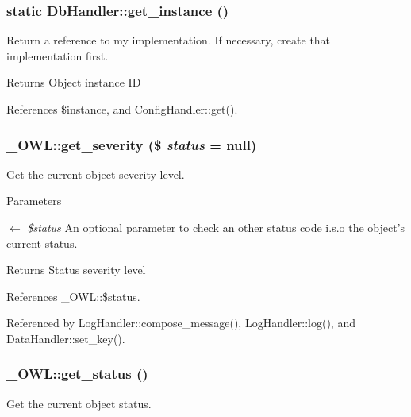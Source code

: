\subsubsection[{get\_\-instance}]{\setlength{\rightskip}{0pt plus 5cm}static DbHandler::get\_\-instance ()}\label{classDbHandler_ae9bfc8bdc6a8077adb342702aaffc9af}
Return a reference to my implementation. If necessary, create that implementation first.

\begin{DoxyReturn}{Returns}
Object instance ID 
\end{DoxyReturn}


References \$instance, and ConfigHandler::get().

\subsubsection[{get\_\-severity}]{\setlength{\rightskip}{0pt plus 5cm}\_\-OWL::get\_\-severity (\$ {\em status} = {\ttfamily null})}\label{class__OWL_adf9509ef96858be7bdd9414c5ef129aa}
Get the current object severity level.


\begin{DoxyParams}{Parameters}
\item[\mbox{$\leftarrow$} {\em \$status}]An optional parameter to check an other status code i.s.o the object's current status. \end{DoxyParams}
\begin{DoxyReturn}{Returns}
Status severity level 
\end{DoxyReturn}


References \_\-OWL::\$status.



Referenced by LogHandler::compose\_\-message(), LogHandler::log(), and DataHandler::set\_\-key().

\subsubsection[{get\_\-status}]{\setlength{\rightskip}{0pt plus 5cm}\_\-OWL::get\_\-status ()}\label{class__OWL_a99ec771fa2c5c279f80152cc09e489a8}
Get the current object status.

